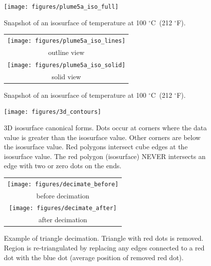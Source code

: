 \documentclass[11pt,twoside]{book}
\newcommand{\degF}{$^\circ$F}
\newcommand{\degC}{$^\circ$C}
\newcommand{\figoptions}{htp}
\begin{document}
\begin{figure}[\figoptions]
\begin{center}
\texttt{[image: figures/plume5a\_iso\_full]}\\
\end{center}
\caption{Snapshot of an isosurface of temperature at 100 \degC\ (212 \degF).
  }
\label{figisoa}%
\end{figure}

\begin{figure}[\figoptions]
\begin{center}
\begin{tabular}{c}
\texttt{[image: figures/plume5a\_iso\_lines]}\\
outline view\\
\texttt{[image: figures/plume5a\_iso\_solid]}\\
solid view
\end{tabular}
\end{center}
\caption{Snapshot of an isosurface of temperature at 100 \degC\ (212 \degF).
  }
\label{figisob}%
\end{figure}

\begin{figure}[\figoptions]
\begin{center}
\texttt{[image: figures/3d\_contours]}
\end{center}
\caption[3D isosurface canonical forms.]{3D isosurface canonical forms.
Dots occur at corners where the data value is greater than the isosurface value.  Other corners are below the isosurface value.  Red polygons intersect cube edges at the isosurface value.  The red polygon (isosurface) NEVER intersects an edge with two or zero dots on the ends.
  }
\label{figisosetup}%
\end{figure}


\begin{figure}[\figoptions]
\begin{center}
\begin{tabular}{c}
\texttt{[image: figures/decimate\_before]}\\
before decimation\\
\texttt{[image: figures/decimate\_after]}\\
after decimation
\end{tabular}
\end{center}
\caption[Example of triangle decimation.]{Example of triangle decimation.  Triangle with red dots is removed.  Region is re-triangulated by replacing any edges connected to a red dot with the blue dot (average position of removed red dot).}
\label{figdecimate}%
\end{figure}
\end{document}
